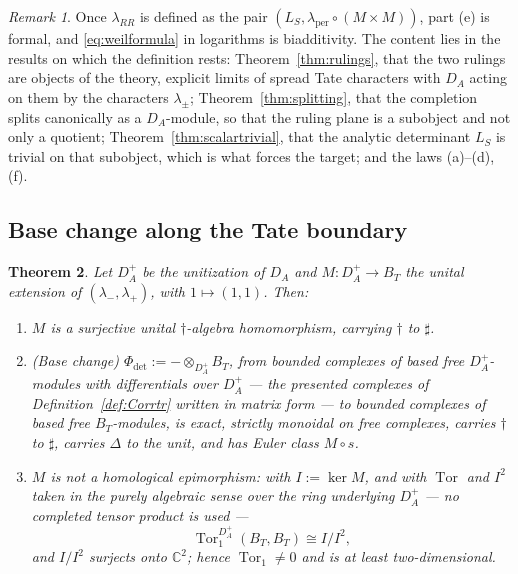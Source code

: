 \documentclass[11pt]{amsart}
\newtheorem{theorem}{Theorem}[section]
\theoremstyle{definition}
\theoremstyle{remark}
\newtheorem{remark}[theorem]{Remark}
\newcommand{\C}{\mathbb C}
\newcommand{\DA}{D_A}
\newcommand{\BT}{B_T}
\begin{document}
\begin{remark}\label{rem:whatRRis}
Once $\lambda_{RR}$ is defined as the pair
$(L_S,\lambda_{\mathrm{per}}\circ(M\times M))$, part (e) is formal, and
\eqref{eq:weilformula} in logarithms is biadditivity.  The content lies in the
results on which the definition rests: Theorem~\ref{thm:rulings}, that the two rulings are objects of the
theory, explicit limits of spread Tate characters with $\DA$ acting on them by
the characters $\lambda_{\pm}$; Theorem~\ref{thm:splitting}, that the
completion splits canonically as a $\DA$-module, so that the ruling plane is a
subobject and not only a quotient; Theorem~\ref{thm:scalartrivial}, that the
analytic determinant $L_S$ is trivial on that subobject, which is what forces
the target; and the laws (a)--(d), (f).
\end{remark}

\subsection{Base change along the Tate boundary}

\begin{theorem}\label{thm:basechange}
Let $\DA^{+}$ be the unitization of $\DA$ and $M:\DA^{+}\to\BT$ the unital
extension of $(\lambda_-,\lambda_+)$, with $1\mapsto(1,1)$.  Then:
\begin{enumerate}
\item[(a)] $M$ is a surjective unital $\dagger$-algebra homomorphism, carrying
$\dagger$ to $\sharp$.
\item[(b)] \emph{(Base change)}  $\Phi_{\det}:=-\otimes_{\DA^{+}}\BT$, from
bounded complexes of based free $\DA^{+}$-modules with differentials over
$\DA^{+}$ --- the presented complexes of Definition~\ref{def:Corrtr} written in
matrix form --- to bounded complexes of based free $\BT$-modules, is exact,
strictly monoidal on free complexes, carries $\dagger$ to $\sharp$, carries
$\Delta$ to the unit, and has Euler class $M\circ s$.
\item[(c)] $M$ is \emph{not} a homological epimorphism: with $I:=\ker M$, and
with $\operatorname{Tor}$ and $I^{2}$ taken in the purely algebraic sense over
the ring underlying $\DA^{+}$ --- no completed tensor product is used ---
\begin{equation}\label{eq:tor}
\operatorname{Tor}_1^{\DA^{+}}(\BT,\BT)\cong I/I^{2},
\end{equation}
and $I/I^{2}$ surjects onto $\C^{2}$; hence $\operatorname{Tor}_1\ne0$ and is
at least two-dimensional.
\end{enumerate}
\end{theorem}
\end{document}
